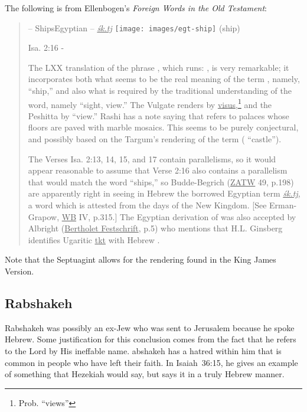 The following is from Ellenbogen's \textit{Foreign Words in the Old Testament}:
\begin{quotation}
  {\noindent{} -- Ships\hfill Egyptian -- \underline{\textit{\'sk.tj}} \texttt{[image: images/egt-ship]} (ship)}
  
  {\noindent Isa. 2:16 -}
  
  The LXX translation of the phrase , which runs: , is very remarkable; it incorporates both what seems to be the real meaning of the term , namely,  ``ship,'' and also what is required by the traditional understanding of the word, namely  ``sight, view.'' The Vulgate renders  by \underline{visus},\footnote{Prob. ``views''} and the Peshitta by  ``view.'' Rashi has a note saying that  refers to palaces whose floors are paved with marble mosaics. This seems to be purely conjectural, and possibly based on the Targum's rendering of the term ( ``castle'').
  
  The Verses Isa. 2:13, 14, 15, and 17 contain parallelisms, so it would appear reasonable to assume that Verse 2:16 also contains a parallelism that would match the word  ``ships,'' so Budde-Begrich (\underline{ZATW} 49, p.198) are apparently right in seeing in Hebrew  the borrowed Egyptian term \underline{\textit{\'sk.tj}}, a word which is attested from the days of the New Kingdom. [See Erman-Grapow, \underline{WB} IV, p.315.] The Egyptian derivation of  was also accepted by Albright (\underline{Bertholet Festschrift}, p.5) who mentions that H.L. Ginsberg identifies Ugaritic \underline{\underline{t}}\underline{kt} with Hebrew .
\end{quotation}

Note that the Septuagint allows for the rendering found in the King James Version.

\subsection{Rabshakeh}\label{app:rabshakeh}
Rabshakeh was possibly an ex-Jew who was sent to Jerusalem because he spoke Hebrew. Some justification for this conclusion comes from the fact that he refers to the Lord by His ineffable name. abshakeh has a hatred within him that is common in people who have left their faith. In Isaiah~36:15, he gives an example of something that Hezekiah would say, but says it in a truly Hebrew manner.
